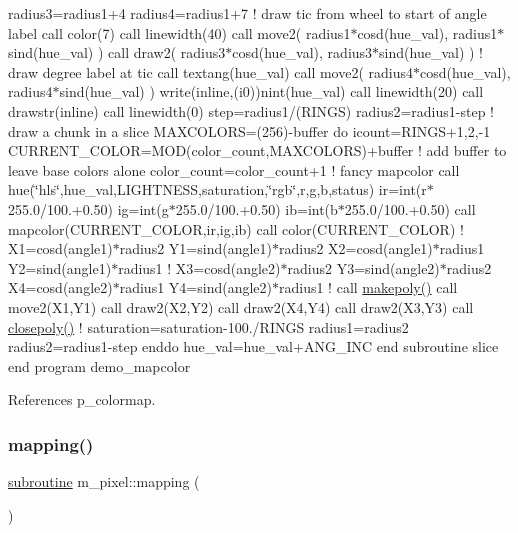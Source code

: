 radius3=radius1+4 radius4=radius1+7 ! draw tic from wheel to start of angle label call color(7) call linewidth(40) call move2( radius1$\ast$cosd(hue\+\_\+val), radius1$\ast$sind(hue\+\_\+val) ) call draw2( radius3$\ast$cosd(hue\+\_\+val), radius3$\ast$sind(hue\+\_\+val) ) ! draw degree label at tic call textang(hue\+\_\+val) call move2( radius4$\ast$cosd(hue\+\_\+val), radius4$\ast$sind(hue\+\_\+val) ) write(inline,\textquotesingle{}(i0)\textquotesingle{})nint(hue\+\_\+val) call linewidth(20) call drawstr(inline) call linewidth(0) step=radius1/(R\+I\+N\+GS) radius2=radius1-\/step ! draw a chunk in a slice M\+A\+X\+C\+O\+L\+O\+RS=(256)-\/buffer do icount=R\+I\+N\+G\+S+1,2,-\/1 C\+U\+R\+R\+E\+N\+T\+\_\+\+C\+O\+L\+OR=M\+O\+D(color\+\_\+count,\+M\+A\+X\+C\+O\+L\+O\+R\+S)+buffer ! add buffer to leave base colors alone color\+\_\+count=color\+\_\+count+1 ! fancy mapcolor call hue(\char`\"{}hls\char`\"{},hue\+\_\+val,L\+I\+G\+H\+T\+N\+E\+SS,saturation,\char`\"{}rgb\char`\"{},r,g,b,status) ir=int(r$\ast$255.0/100.+0.50) ig=int(g$\ast$255.0/100.+0.50) ib=int(b$\ast$255.0/100.+0.50) call mapcolor(\+C\+U\+R\+R\+E\+N\+T\+\_\+\+C\+O\+L\+O\+R,ir,ig,ib) call color(\+C\+U\+R\+R\+E\+N\+T\+\_\+\+C\+O\+L\+O\+R) ! X1=cosd(angle1)$\ast$radius2 Y1=sind(angle1)$\ast$radius2 X2=cosd(angle1)$\ast$radius1 Y2=sind(angle1)$\ast$radius1 ! X3=cosd(angle2)$\ast$radius2 Y3=sind(angle2)$\ast$radius2 X4=cosd(angle2)$\ast$radius1 Y4=sind(angle2)$\ast$radius1 ! call \hyperlink{namespacem__pixel_ab7128437f95b40004bf73fc6e3f597f8}{makepoly()} call move2(\+X1,\+Y1) call draw2(\+X2,\+Y2) call draw2(\+X4,\+Y4) call draw2(\+X3,\+Y3) call \hyperlink{namespacem__pixel_ab3dc83b63d2ab1bf3f63932abca4245d}{closepoly()} ! saturation=saturation-\/100./\+R\+I\+N\+GS radius1=radius2 radius2=radius1-\/step enddo hue\+\_\+val=hue\+\_\+val+\+A\+N\+G\+\_\+\+I\+NC end subroutine slice end program demo\+\_\+mapcolor 

References p\+\_\+colormap.

\mbox{\label{namespacem__pixel_a84c841de62fc0addddeff305c4ede9d4}} 
\subsubsection{\texorpdfstring{mapping()}{mapping()}}
{\footnotesize\ttfamily \hyperlink{M__stopwatch_83_8txt_acfbcff50169d691ff02d4a123ed70482}{subroutine} m\+\_\+pixel\+::mapping (\begin{DoxyParamCaption}{ }\end{DoxyParamCaption})\hspace{0.3cm}{\ttfamily [private]}}



